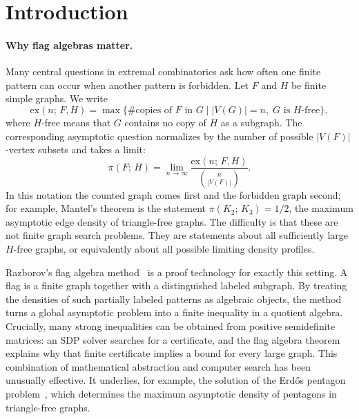 \documentclass{article}
\newcommand{\tdensity}[2]{\pi(#1;\,#2)}
\begin{document}
\section{Introduction}
\label{sec:intro}

\paragraph{Why flag algebras matter.}
Many central questions in extremal combinatorics ask how often one finite
pattern can occur when another pattern is forbidden.  Let $F$ and $H$ be
finite simple graphs.  We write
\[
  \mathrm{ex}(n;\,F,H)
  =
  \max\bigl\{
    \#\text{copies of }F\text{ in }G
    \mid |V(G)|=n,\; G\text{ is }H\text{-free}
  \bigr\},
\]
where $H$-free means that $G$ contains no copy of $H$ as a subgraph.  The
corresponding asymptotic question normalizes by the number of possible
$|V(F)|$-vertex subsets and takes a limit:
\[
  \tdensity{F}{H}
  =
  \lim_{n\to\infty}
  \frac{\mathrm{ex}(n;\,F,H)}{\binom{n}{|V(F)|}}.
\]
In this notation the counted graph comes first and the forbidden graph second;
for example, Mantel's theorem is the statement
$\tdensity{K_2}{K_3}=1/2$, the maximum asymptotic edge density of
triangle-free graphs.  The difficulty is that these are not finite graph
search problems.  They are statements about all sufficiently large
$H$-free graphs, or equivalently about all possible limiting density profiles.

Razborov's flag algebra method~\cite{razborov2007flag} is a proof technology
for exactly this setting.  A flag is a finite graph together with a
distinguished labeled subgraph.  By treating the densities of such partially
labeled patterns as algebraic objects, the method turns a global asymptotic
problem into a finite inequality in a quotient algebra.  Crucially, many
strong inequalities can be obtained from positive semidefinite matrices: an
SDP solver searches for a certificate, and the flag algebra theorem explains
why that finite certificate implies a bound for every large graph.  This
combination of mathematical abstraction and computer search has been unusually
effective.  It underlies, for example, the solution of the Erd\H{o}s pentagon
problem~\cite{hatami2012,grzesik2012}, which determines the maximum asymptotic
density of pentagons in triangle-free graphs.
\end{document}
